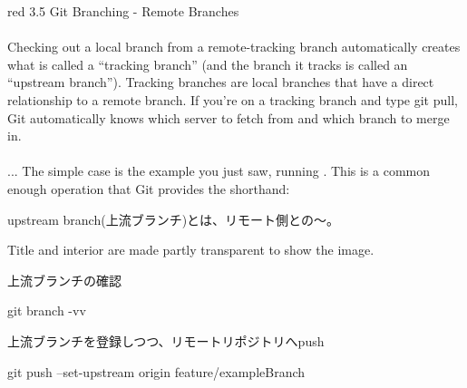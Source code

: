 \documentclass[11pt,a4paper,openany,dvipdfmx]{jsarticle}
\begin{document}
\begin{ColorReferenceBox}{red}
3.5 Git Branching - Remote Branches\\
\\
Checking out a local branch from a remote-tracking branch automatically creates what is called a “tracking branch” (and the branch it tracks is called an “upstream branch”). Tracking branches are local branches that have a direct relationship to a remote branch. If you’re on a tracking branch and type git pull, Git automatically knows which server to fetch from and which branch to merge in.\\
\\
... The simple case is the example you just saw, running . This is a common enough operation that Git provides the   shorthand:
\end{ColorReferenceBox}


\begin{tcolorbox}[enhanced,frame style image=blueshade.png,
opacityback=0.75,opacitybacktitle=0.25,
colback=blue!5!white,colframe=blue!75!black,
boxrule=1.0mm, title=上流ブランチ/下流ブランチ]
upstream branch(上流ブランチ)とは、リモート側との〜。\par
Title and interior are made partly transparent to show the image.
\end{tcolorbox}


上流ブランチの確認
\begin{commandshell}
git branch -vv
\end{commandshell}

上流ブランチを登録しつつ、リモートリポジトリへpush
\begin{commandshell}
git push --set-upstream origin feature/exampleBranch
\end{commandshell}


\end{document}
